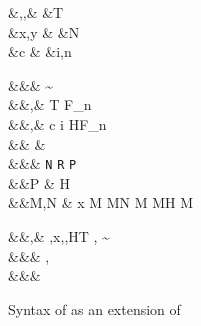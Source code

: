 \documentclass[manuscript,screen,nonacm]{acmart}
\begin{document}
  \begin{figure}[h]
    \begin{syntax}
     &\TyVar,\beta,\Co  &\qquad{} &T \\
     &x,y                  &\qquad{}       &N \\
     &c                &\qquad{}        &i,n \in {} \\
  \end{syntax}
  \begin{syntax}
         &&\kappa       \bnfeq& \star \bnfor \kappa \to \kappa \bnfor \sigma \sim \tau\\
         &&\tau,\sigma  \bnfeq& \TyVar \bnfor T \bnfor \tau \to \tau \bnfor \tau\App\tau \bnfor \Forall {\TyVar\co\kappa} \tau \bnfor F_n\\
     &&\nu,\Co      \bnfeq& c \bnfor {}\tau \bnfor \Sym\Co \bnfor \trans\nu\Co %
                                        \bnfor \Forall {\TyVar\co\kappa} \Co \bnfor \Co\At\tau %
                                        \bnfor \nu\App\Co \bnfor \Left \Co \bnfor \Right \Co \bnfor \Nth i \Co \bnfor H\App\many\Co \bnfor F_n\many\Co \bnfor \SubCo \Co
                                        \\  %
     && \phi \bnfeq& \tau \bnfor \Co\\
               &&\rho  \bnfeq& \texttt{N} \bnfor \texttt{R} \bnfor \texttt{P}\\
      &&P    \bnfeq& H\App \many{\TyVar\co\kappa} \\
         &&M,N  \bnfeq& x \bnfor  {} M \bnfor M\App N \bnfor \TLam{\tau\co\kappa} M \bnfor M\App \tau \bnfor H \bnfor \Case M  \bnfor \Cast \Tm \Co
    \end{syntax}
    \begin{syntax}
       &&\TEnv,\Delta \bnfeq& \empt \bnfor \TEnv,x\co\tau \bnfor \TEnv,\TyVar\co\kappa \bnfor \TEnv,H\co T \bnfor \TEnv, \Co \co \tau\sim\sigma\\
       &&\REnv        \bnfeq& \empt \bnfor \REnv, \TyVar\co\rho\\
      &&\Subst       \bnfeq& \empt \bnfor \Set{\many{\TyVar \mapsto \tau}}
  \end{syntax}

    \caption{Syntax of \SFR as an extension of \SFC}
    \label{fig:sfr-syntax}
  \end{figure}
\end{document}
